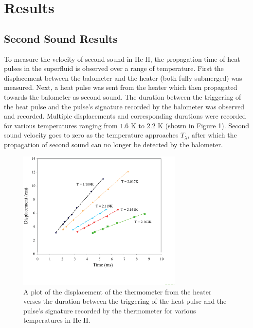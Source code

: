 
\section{Results}
\label{results}

\subsection{Second Sound Results}
\label{secondsoundresults}

To measure the velocity of second sound in He II, the propagation time of heat pulses in the superfluid is observed over a range of temperature.  First the displacement between the balometer and the heater (both fully submerged) was measured. Next, a heat pulse was sent from the heater which then propagated towards the balometer as second sound.  The duration between the triggering of the heat pulse and the pulse's signature recorded by the balometer was observed and recorded.  Multiple displacements and corresponding durations were recorded for various temperatures ranging from $1.6$ K to $2.2$ K (shown in Figure \ref{fig:secondsoundraw}). Second sound velocity goes to zero as the temperature approaches $T_{\lambda}$, after which the propagation of second sound can no longer be detected by the balometer.  


\begin{figure}[htbp]
\begin{center}
\includegraphics[height=70mm]{./figures/secondsoundraw.eps}
\caption{\small{A plot of the displacement of the thermometer from the heater verses the duration between the triggering of the heat pulse and the pulse's signature recorded by the thermometer for various temperatures in He II.}}
\label{fig:secondsoundraw}
\end{center}
\end{figure}


